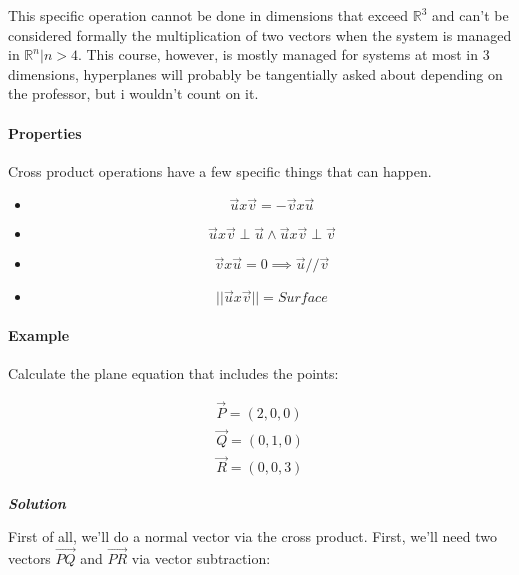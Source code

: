 \documentclass[11pt,fleqn]{book} %
\begin{document}
This specific operation cannot be done in dimensions that exceed $\mathbb{R}^3$
and can't be considered formally the multiplication of two vectors when the system is managed in $\mathbb{R}^n | n > 4$.
This course, however, is mostly managed for systems at most in 3 dimensions, hyperplanes will probably be tangentially 
asked about depending on the professor, but i wouldn't count on it. 

\paragraph{Properties}

Cross product operations have a few specific things that can happen.

\begin{itemize}
    \item $$\vec{u} x \vec{v} = - \vec{v} x \vec{u}$$
    \item $$ \vec{u} x \vec{v} \perp \vec{u} \land \vec{u} x \vec{v} \perp \vec{v} $$
    \item $$\vec{v} x \vec{u} = 0 \implies \vec{u} // \vec{v}$$
    \item $$||\vec{u} x \vec{v}|| = Surface$$
\end{itemize}

\paragraph*{Example}

Calculate the plane equation that includes the points:

\begin{gather}
    \vec{P} = (2,0,0) \\
    \vec{Q} = (0,1,0) \\
    \vec{R} = (0,0,3)
\end{gather}

\textit{\textbf{Solution}}

First of all, we'll do a normal vector via the cross product.
First, we'll need two vectors $\vec{PQ}$ and $\vec{PR}$ via vector subtraction:
\end{document}
